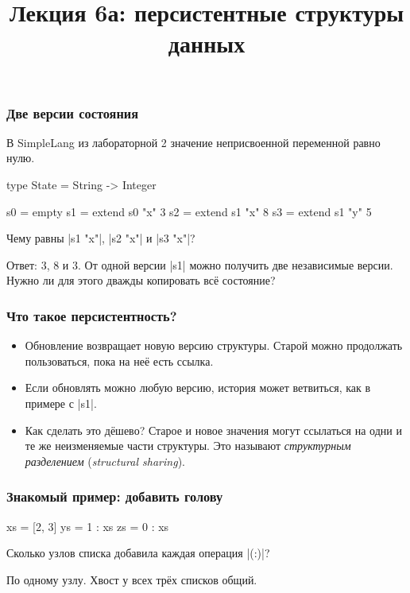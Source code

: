 \documentclass[11pt]{beamer}
\title{Лекция 6а: персистентные структуры данных}
\begin{document}
\begin{frame}[plain]
  \maketitle
\end{frame}

\begin{frame}[fragile]
  \frametitle{Две версии состояния}
  В SimpleLang из лабораторной 2 значение неприсвоенной переменной равно нулю.
  \begin{haskell}
    type State = String -> Integer

    s0 = empty
    s1 = extend s0 "x" 3
    s2 = extend s1 "x" 8
    s3 = extend s1 "y" 5
  \end{haskell}
  Чему равны \haskinline|s1 "x"|, \haskinline|s2 "x"| и \haskinline|s3 "x"|? \pause

  Ответ: 3, 8 и 3. От одной версии \haskinline|s1| можно получить две независимые версии. Нужно ли для этого дважды копировать всё состояние?
\end{frame}

\begin{frame}[fragile]
  \frametitle{Что такое персистентность?}
  \begin{itemize}
    \item Обновление возвращает новую версию структуры. Старой можно продолжать пользоваться, пока на неё есть ссылка.
    \item Если обновлять можно любую версию, история может ветвиться, как в примере с \haskinline|s1|.
    \item Как сделать это дёшево? \pause{} Старое и новое значения могут ссылаться на одни и те же неизменяемые части структуры. Это называют \emph{структурным разделением} (\emph{structural sharing}).
  \end{itemize}
\end{frame}

\begin{frame}[fragile]
  \frametitle{Знакомый пример: добавить голову}
  \begin{haskell}
    xs = [2, 3]
    ys = 1 : xs
    zs = 0 : xs
  \end{haskell}
  Сколько узлов списка добавила каждая операция \haskinline|(:)|? \pause

  \begin{center}
  \end{center}
  По одному узлу. Хвост у всех трёх списков общий.
\end{frame}
\end{document}
